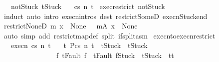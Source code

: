 \begin{isabellebody}
\ \ \ notStuck{\isacharcolon}\ {\isachardoublequoteopen}t{\isasymnoteq}Stuck{\isachardoublequoteclose}\isanewline
\ \ \ {\isachardoublequoteopen}{\isasymGamma}{\isasymturnstile}{\isasymlangle}c{\isacharcomma}s{\isasymrangle}\ {\isacharequal}n{\isasymRightarrow}\ t{\isachardoublequoteclose}\isanewline
%
\isadelimproof
%
\endisadelimproof
%
\isatagproof
{}\isamarkupfalse%
\ exec{\isacharunderscore}restrict\ notStuck\isanewline
{}\isamarkupfalse%
\ {\isacharparenleft}induct{\isacharparenright}\ {\isacharparenleft}auto\ intro{\isacharcolon}\ execn{\isachardot}intros\ dest{\isacharcolon}\ restrict{\isacharunderscore}SomeD\ execn{\isacharunderscore}Stuck{\isacharunderscore}end{\isacharparenright}%
\endisatagproof
{\isafoldproof}%
%
\isadelimproof
\isanewline
%
\endisadelimproof
\isanewline
{}\isamarkupfalse%
\ restrict{\isacharunderscore}NoneD{\isacharcolon}\ {\isachardoublequoteopen}m\ x\ {\isacharequal}\ None\ {\isasymLongrightarrow}\ \ {\isacharparenleft}m{\isacharbar}\isactrlbsub A\isactrlesub {\isacharparenright}\ x\ {\isacharequal}\ None{\isachardoublequoteclose}\isanewline
%
\isadelimproof
\ \ %
\endisadelimproof
%
\isatagproof
{}\isamarkupfalse%
\ {\isacharparenleft}auto\ simp\ add{\isacharcolon}\ restrict{\isacharunderscore}map{\isacharunderscore}def\ split{\isacharcolon}\ if{\isacharunderscore}split{\isacharunderscore}asm{\isacharparenright}%
\endisatagproof
{\isafoldproof}%
%
\isadelimproof
\isanewline
%
\endisadelimproof
\isanewline
{}\isamarkupfalse%
\ execn{\isacharunderscore}to{\isacharunderscore}execn{\isacharunderscore}restrict{\isacharcolon}\isanewline
\ \ \ execn{\isacharcolon}\ {\isachardoublequoteopen}{\isasymGamma}{\isasymturnstile}{\isasymlangle}c{\isacharcomma}s{\isasymrangle}\ {\isacharequal}n{\isasymRightarrow}\ t{\isachardoublequoteclose}\isanewline
\ \ \ {\isachardoublequoteopen}{\isasymexists}t{\isacharprime}{\isachardot}\ {\isasymGamma}{\isacharbar}\isactrlbsub P\isactrlesub {\isasymturnstile}{\isasymlangle}c{\isacharcomma}s{\isasymrangle}\ {\isacharequal}n{\isasymRightarrow}\ t{\isacharprime}\ {\isasymand}\ {\isacharparenleft}t{\isacharequal}Stuck\ {\isasymlongrightarrow}\ t{\isacharprime}{\isacharequal}Stuck{\isacharparenright}\ {\isasymand}\ \isanewline
\ \ \ \ \ \ \ \ \ \ \ \ \ \ \ \ {\isacharparenleft}{\isasymforall}f{\isachardot}\ t{\isacharequal}Fault\ f\ {\isasymlongrightarrow}\ t{\isacharprime}{\isasymin}{\isacharbraceleft}Fault\ f{\isacharcomma}Stuck{\isacharbraceright}{\isacharparenright}\ {\isasymand}\ {\isacharparenleft}t{\isacharprime}{\isasymnoteq}Stuck\ {\isasymlongrightarrow}\ t{\isacharprime}{\isacharequal}t{\isacharparenright}{\isachardoublequoteclose}\isanewline

\end{isabellebody}

